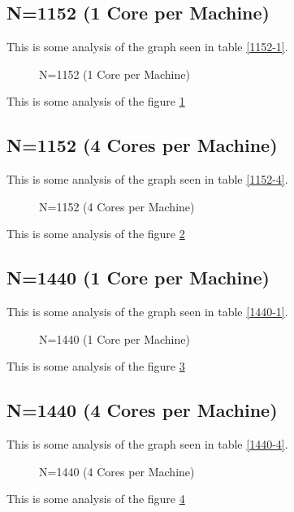 \documentclass[a4paper]{article}
\begin{document}
\subsection{N=1152 (1 Core per Machine)}

This is some analysis of the graph seen in table \ref{1152-1}.

\begin{figure}
    
    \caption{N=1152 (1 Core per Machine)}
    \label{fig:1152_1}
\end{figure}

This is some analysis of the figure \ref{fig:1152_1}

\subsection{N=1152 (4 Cores per Machine)}

This is some analysis of the graph seen in table \ref{1152-4}.

\begin{figure}
    
    \caption{N=1152 (4 Cores per Machine)}
    \label{fig:1152_4}
\end{figure}

This is some analysis of the figure \ref{fig:1152_4}

\subsection{N=1440 (1 Core per Machine)}

This is some analysis of the graph seen in table \ref{1440-1}.

\begin{figure}
    
    \caption{N=1440 (1 Core per Machine)}
    \label{fig:1440_1}
\end{figure}

This is some analysis of the figure \ref{fig:1440_1}

\subsection{N=1440 (4 Cores per Machine)}

This is some analysis of the graph seen in table \ref{1440-4}.

\begin{figure}
    
    \caption{N=1440 (4 Cores per Machine)}
    \label{fig:1440_4}
\end{figure}

This is some analysis of the figure \ref{fig:1440_4}
\end{document}
